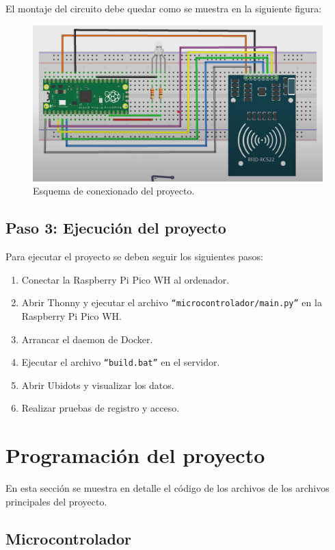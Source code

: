 \documentclass{article}
\begin{document}
El montaje del circuito debe quedar como se muestra en la siguiente figura:
\begin{figure}[H]
	\centering
	\includegraphics[width=1\linewidth]{../images/esquema_de_conexionado.png}
	\caption{\label{fig:circuito}Esquema de conexionado del proyecto.}
\end{figure}

\subsection{Paso 3: Ejecución del proyecto}
Para ejecutar el proyecto se deben seguir los siguientes pasos:
\begin{enumerate}
	\item Conectar la Raspberry Pi Pico WH al ordenador.
	\item Abrir Thonny y ejecutar el archivo \texttt{``microcontrolador/main.py''} en la Raspberry Pi Pico WH.
	\item Arrancar el daemon de Docker.
	\item Ejecutar el archivo \texttt{``build.bat''} en el servidor.
	\item Abrir Ubidots y visualizar los datos.
	\item Realizar pruebas de registro y acceso.
\end{enumerate}

\section{Programación del proyecto}
En esta sección se muestra en detalle el código de los archivos de los archivos principales del proyecto.

\subsection{Microcontrolador}
\end{document}
